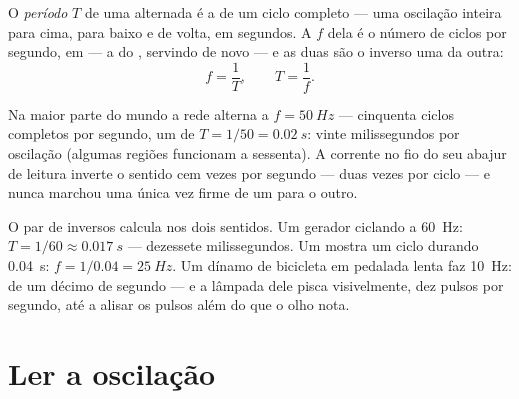 \begin{definition}\label{def:g9:alternating-current:period}
O \emph{período} $T$ de uma  alternada é a
 de um ciclo completo --- uma oscilação inteira para cima,
para baixo e de volta, em segundos. A \emph{} $f$ dela é o
número de ciclos por segundo, em  --- a  do ,
servindo de novo --- e as duas são o inverso uma da outra:
\[
f = \frac{1}{T}, \qquad T = \frac{1}{f}.
\]
\end{definition}

\begin{proposition}\label{prop:g9:alternating-current:mains}
Na maior parte do mundo a rede alterna a $f = \qty{50}{Hz}$ ---
cinquenta ciclos completos por segundo, um  de
$T = 1/50 = \qty{0.02}{s}$: vinte milissegundos por oscilação
(algumas regiões funcionam a sessenta). A corrente no fio do seu
abajur de leitura inverte o sentido cem vezes por segundo --- duas
vezes por ciclo --- e nunca marchou uma única vez firme de um
 para o outro.
\end{proposition}

\begin{example}\label{ex:g9:alternating-current:arithmetic}
O par de inversos calcula nos dois sentidos. Um gerador ciclando a
\qty{60}{Hz}: $T = 1/60 \approx \qty{0.017}{s}$ --- dezessete
milissegundos. Um  mostra um ciclo durando \qty{0.04}{s}:
$f = 1/0.04 = \qty{25}{Hz}$. Um dínamo de bicicleta em pedalada lenta
faz \qty{10}{Hz}:  de um décimo de segundo --- e a lâmpada
dele pisca visivelmente, dez pulsos por segundo, até a 
alisar os pulsos além do que o olho nota.
\end{example}

\section{Ler a oscilação}

